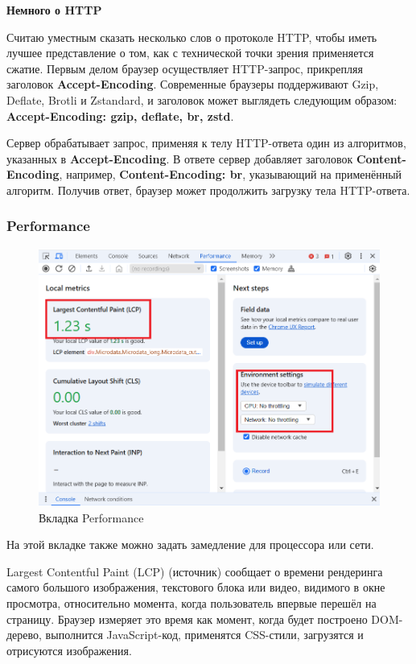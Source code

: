\documentclass[12pt]{article}
\begin{document}
\textbf{Немного о HTTP}

Считаю уместным сказать несколько слов о протоколе HTTP, чтобы иметь лучшее представление
о том, как с технической точки зрения применяется сжатие.
Первым делом браузер осуществляет HTTP-запрос, прикрепляя заголовок \textbf{Accept-Encoding}.
Современные браузеры поддерживают Gzip, Deflate, Brotli и Zstandard,
и заголовок может выглядеть следующим образом:
\textbf{Accept-Encoding: gzip, deflate, br, zstd}.

Сервер обрабатывает запрос, применяя к телу HTTP-ответа один из алгоритмов,
указанных в \textbf{Accept-Encoding}. В ответе сервер добавляет заголовок \textbf{Content-Encoding},
например, \textbf{Content-Encoding: br}, указывающий на применённый алгоритм.
Получив ответ, браузер может продолжить загрузку тела HTTP-ответа.

\subsubsection{Performance}

\begin{figure}[H]
    \centering
    \includegraphics[width=1\textwidth]{../images/performance.png}
    \caption{Вкладка Performance}
\end{figure}

На этой вкладке также можно задать замедление для процессора или сети.

Largest Contentful Paint (LCP) (источник)
сообщает о времени рендеринга самого большого изображения, текстового блока или видео,
видимого в окне просмотра, относительно момента, когда пользователь впервые перешёл на страницу.
Браузер измеряет это время как момент, когда будет построено DOM-дерево,
выполнится JavaScript-код, применятся CSS-стили, загрузятся и отрисуются изображения.
\end{document}
